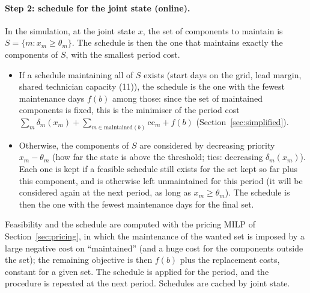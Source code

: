 \documentclass[11pt]{article}
\begin{document}
\paragraph{Step 2: schedule for the joint state (online).} In the simulation, at the joint
state $x$, the set of components to maintain is $S = \{m : x_m \ge \theta_m\}$. The schedule
is then the one that maintains exactly the components of $S$, with the smallest period cost.
\begin{itemize}
  \item If a schedule maintaining all of $S$ exists (start days on the grid, lead margin,
  shared technician capacity (11)), the schedule is the one with the fewest maintenance days
  $f(b)$ among those: since the set of maintained components is fixed, this is the minimiser
  of the period cost $\sum_m \delta_m(x_m) + \sum_{m \in \mathrm{maintained}(b)} \mathrm{cc}_m + f(b)$
  (Section~\ref{sec:simplified}).
  \item Otherwise, the components of $S$ are considered by decreasing priority
  $x_m - \theta_m$ (how far the state is above the threshold; ties: decreasing $\delta_m(x_m)$).
  Each one is kept if a feasible schedule still exists for the set kept so far plus this
  component, and is otherwise left unmaintained for this period (it will be considered again
  at the next period, as long as $x_m \ge \theta_m$). The schedule is then the one with the
  fewest maintenance days for the final set.
\end{itemize}
Feasibility and the schedule are computed with the pricing MILP of
Section~\ref{sec:pricing}, in which the maintenance of the wanted set is imposed by a large
negative cost on ``maintained'' (and a huge cost for the components outside the set); the
remaining objective is then $f(b)$ plus the replacement costs, constant for a given set.
The schedule is applied for the period, and the procedure is repeated at the next period.
Schedules are cached by joint state.
\end{document}
